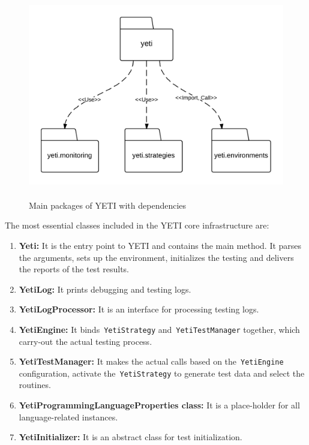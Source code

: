 \bigskip
\begin{figure}[h]
	\centering
	\includegraphics[width=14cm, height=9cm]{chapter3/yetiStructure.png}
	\smallskip
	\caption{Main packages of YETI with dependencies }
	\label{fig:yetiCore}
\end{figure}
\bigskip
\bigskip
\bigskip
The most essential classes included in the YETI core infrastructure are:
\begin{enumerate}
\item {\textbf{Yeti:}} It is the entry point to YETI and contains the main method. It parses the arguments, sets up the environment, initializes the testing and delivers the reports of the test results.
\item {\textbf{YetiLog:}} It prints debugging and testing logs. 
\item {\textbf{YetiLogProcessor:}} It is an interface for processing testing logs.
\item {\textbf{YetiEngine:}} It binds~\verb+YetiStrategy+ and~\verb+YetiTestManager+ together, which carry-out the actual testing process.
\item {\textbf{YetiTestManager:}} It makes the actual calls based on the~\verb+YetiEngine+ configuration, activate the~\verb+YetiStrategy+ to generate test data and select the routines.
\item {\textbf{YetiProgrammingLanguageProperties class:}} It is a place-holder for all language-related instances.
\item {\textbf{YetiInitializer:}} It is an abstract class for test initialization.
\end{enumerate}

